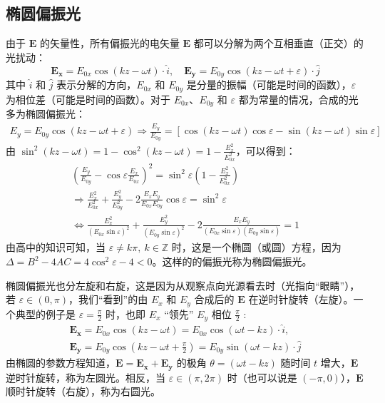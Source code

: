 \documentclass[UTF8]{report}
\def\Z{\mathbb{Z}}
\theoremstyle{MyLineTheoremStyle} %
\theoremstyle{MyBlockTheoremStyle} %
\theoremstyle{MySubsubsectionStyle} %
\begin{document}
\subsection{椭圆偏振光}
由于 $\boldsymbol{E}$ 的矢量性，所有偏振光的电矢量 $\boldsymbol{E}$ 都可以分解为两个互相垂直（正交）的光扰动：
\begin{equation}
\boldsymbol{E_x} =  E_{0x} \cos(kz - \omega t) \cdot \hat{i},\quad \boldsymbol{E_y} =  E_{0y} \cos(kz - \omega t + \varepsilon) \cdot \hat{j}
\end{equation}
其中 $\hat{i}$ 和 $\hat{j}$ 表示分解的方向，$E_{0x}$ 和 $E_{0y}$ 是分量的振幅（可能是时间的函数），$\varepsilon$ 为相位差（可能是时间的函数）。对于 $E_{0x}$、$E_{0y}$ 和 $\varepsilon$ 都为常量的情况，合成的光多为椭圆偏振光：
\begin{gather}
    E_y = E_{0y} \cos(kz - \omega t + \varepsilon) \Longrightarrow 
    \frac{E_y}{E_{0y}} = 
    \left[\cos(kz - \omega t) \cos \varepsilon - \sin(kz - \omega t) \sin \varepsilon\right] 
\end{gather}
由 $\sin^2 (kz - \omega t) = 1 - \cos^2 (kz - \omega t) = 1 - \frac{E_x^2}{E_{0x}^2}$，可以得到：
\begin{gather}
\left( \frac{E_y}{E_{0y}} -  \cos \varepsilon\frac{E_x}{E_{0x}} \right)^2 = \sin^2 \varepsilon \left( 1 - \frac{E_x^2}{E_{0x}^2} \right) \\ 
\Longrightarrow 
\frac{E_x^2}{E_{0x}^2} + \frac{E_y^2}{E_{0y}^2} - 2 \frac{E_xE_y}{E_{0x}E_{0y}} \cos \varepsilon = \sin^2 \varepsilon \\ 
\Longleftrightarrow \frac{E_x^2}{(E_{0x} \sin \varepsilon)^2} + \frac{E_y^2}{(E_{0y} \sin \varepsilon)^2} - 2 \frac{E_xE_y}{(E_{0x} \sin \varepsilon )(E_{0y} \sin \varepsilon)} = 1
\end{gather}
由高中的知识可知，当 $\varepsilon \ne k \pi,\  k \in \Z$ 时，这是一个椭圆（或圆）方程，因为 $\Delta = B^2 - 4AC = 4 \cos^2 \varepsilon - 4 < 0$。这样的的偏振光称为椭圆偏振光。

椭圆偏振光也分左旋和右旋，这是因为从观察点向光源看去时（光指向“眼睛”），若 $\varepsilon \in (0, \pi)$，我们“看到”的由 $E_x$ 和 $E_y$ 合成后的 $\boldsymbol{E}$ 在逆时针旋转（左旋）。一个典型的例子是 $\varepsilon = \frac{\pi}{2}$ 时，也即 $E_x$ “领先” $E_y$ 相位 $\frac{\pi}{2}$ :
\begin{gather}
\boldsymbol{E_x} = E_{0x} \cos (kz - \omega t) = E_{0x} \cos (\omega t - kz) \cdot \hat{i},\quad \\ 
\boldsymbol{E_y} = E_{0y} \cos (kz - \omega t + \frac{\pi}{2}) 
= E_{0y} \sin (\omega t - kz) \cdot \hat{j}
\end{gather}
由椭圆的参数方程知道，$\boldsymbol{E} = \boldsymbol{E_x} + \boldsymbol{E_y}$ 的极角 $\theta = (\omega t - kz)$ 随时间 $t$ 增大，$\boldsymbol{E}$ 逆时针旋转，称为左圆光。相反，当 $\varepsilon \in (\pi, 2\pi)$ 时（也可以说是 $(-\pi, 0)$），$\boldsymbol{E}$ 顺时针旋转（右旋），称为右圆光。
\end{document}
